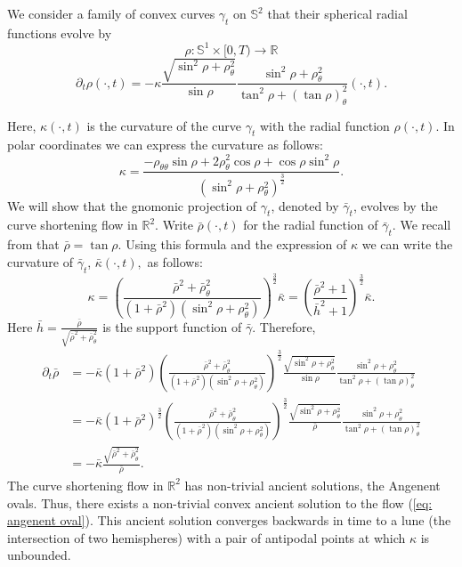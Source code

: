 \documentclass{amsart}
\begin{document}
\begin{example}
We consider a family of convex curves $\gamma_t$ on $\mathbb{S}^2$ that their spherical radial functions evolve by
\[\rho:\mathbb{S}^1\times[0,T)\to \mathbb{R}\]
\begin{equation}\label{eq: angenent oval}
\partial_t\rho(\cdot,t)=-\kappa \frac{\sqrt{\sin^2\rho+\rho_{\theta}^2}}{\sin\rho}\frac{\sin^2\rho+\rho_{\theta}^2}{\tan^2\rho+(\tan\rho)_{\theta}^2}(\cdot,t).
\end{equation}

Here, $\kappa(\cdot,t)$ is the curvature of the curve $\gamma_t$ with the radial function $\rho(\cdot,t).$ 
In polar coordinates we can express the curvature as follows:
\[\kappa=\frac{-\rho_{\theta\theta}\sin\rho+2\rho_\theta^2\cos\rho+\cos\rho\sin^2\rho}{(\sin^2\rho+\rho_{\theta}^2)^{\frac{3}{2}}}.\]
We will show that the gnomonic projection of $\gamma_t$, denoted by $\bar{\gamma}_t$, evolves by the curve shortening flow in $\mathbb{R}^2.$ Write $\bar{\rho}(\cdot,t)$ for the radial function of $\bar{\gamma}_t$. We recall from \cite[p.~8]{besau2014spherical} that
$\bar{\rho}=\tan\rho.$ Using this formula and the expression of $\kappa$ we can write the curvature of $\bar{\gamma}_t$,  $\bar{\kappa}(\cdot,t),$ as follows:
\[\kappa=\left(\frac{\bar{\rho}^2+\bar{\rho}_{\theta}^2}{(1+\bar{\rho}^2)(\sin^2\rho+\rho_{\theta}^2)}\right)^{\frac{3}{2}}\bar{\kappa}=\left(\frac{\bar{\rho}^2+1}{\bar{h}^2+1}\right)^{\frac{3}{2}}\bar{\kappa}.\]
Here $\bar{h}=\frac{\bar{\rho}}{\sqrt{\bar{\rho}^2+\bar{\rho}_{\theta}^2}}$ is the support function of $\bar{\gamma}.$
Therefore, 
\begin{align*}
\partial_t\bar{\rho}&=-\bar{\kappa}(1+\bar{\rho}^2)\left(\frac{\bar{\rho}^2+\bar{\rho}_{\theta}^2}{(1+\bar{\rho}^2)(\sin^2\rho+\rho_{\theta}^2)}\right)^{\frac{3}{2}}\frac{\sqrt{\sin^2\rho+\rho_{\theta}^2}}{\sin\rho}\frac{\sin^2\rho+\rho_{\theta}^2}{\tan^2\rho+(\tan\rho)_{\theta}^2}\\
&=-\bar{\kappa}(1+\bar{\rho}^2)^{\frac{3}{2}}\left(\frac{\bar{\rho}^2+\bar{\rho}_{\theta}^2}{(1+\bar{\rho}^2)(\sin^2\rho+\rho_{\theta}^2)}\right)^{\frac{3}{2}}\frac{\sqrt{\sin^2\rho+\rho_{\theta}^2}}{\bar{\rho}}\frac{\sin^2\rho+\rho_{\theta}^2}{\tan^2\rho+(\tan\rho)_{\theta}^2}\\
&=-\bar{\kappa}\frac{\sqrt{\bar{\rho}^2+\bar{\rho}_{\theta}^2}}{\bar{\rho}}.
\end{align*}
The curve shortening flow in $\mathbb{R}^2$ has non-trivial ancient solutions, the Angenent ovals. Thus, there exists a non-trivial convex ancient solution to the flow (\ref{eq: angenent oval}). This ancient solution converges backwards in time to a lune (the intersection of two hemispheres) with a pair of antipodal points at which \(\kappa\) is unbounded.
\end{example}
\end{document}

